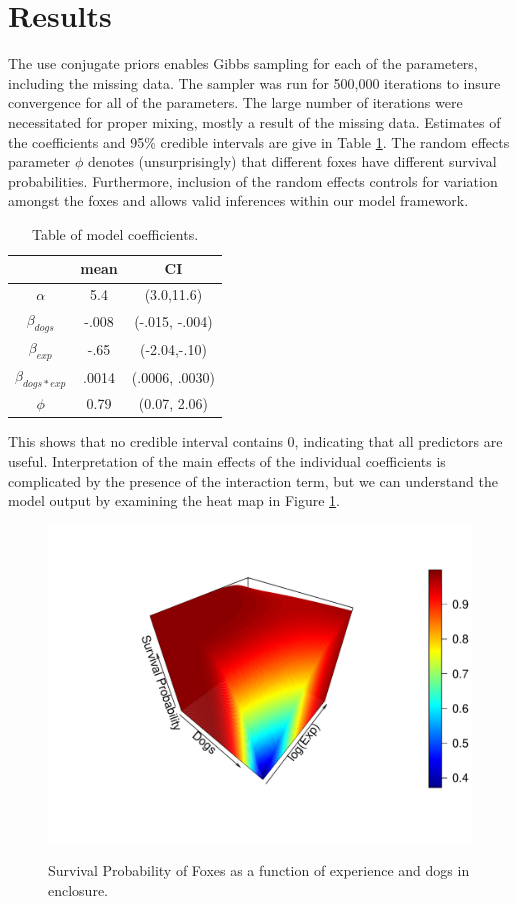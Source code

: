 \documentclass[aoas,preprint]{imsart}
\numberwithin{equation}{section}
\theoremstyle{plain}
\begin{document}
\section{Results}
The use conjugate priors enables Gibbs sampling for each of the parameters, including the missing data. The sampler was run for 500,000 iterations to insure convergence for all of the parameters. The large number of iterations were necessitated for proper mixing, mostly a result of the missing data. Estimates of the coefficients and 95\% credible intervals are give in Table \ref{tab:PostEst}. The random effects parameter $\phi$ denotes (unsurprisingly) that different foxes have different survival probabilities. Furthermore, inclusion of the random effects controls for variation amongst the foxes and allows valid inferences within our model framework.
\begin{table}[h!]
	\begin{center}
		\begin{tabular}{|c|c|c|}
			\hline
			& mean & CI \\
			\hline
			$\alpha$ & 5.4 & (3.0,11.6) \\
			$\beta_{dogs}$ & -.008 & (-.015, -.004) \\
			$\beta_{exp}$ & -.65 & (-2.04,-.10) \\
			$\beta_{dogs*exp}$ & .0014 & (.0006, .0030)\\
			$ \phi$ & 0.79 & (0.07, 2.06) \\
			\hline
		\end{tabular}
		\label{tab:PostEst}
	\end{center}
	\caption{Table of model coefficients.}
\end{table}
 This shows that no credible interval contains 0, indicating that all predictors are useful. Interpretation of the main effects of the individual coefficients is complicated by the presence of the interaction term, but we can understand the model output by examining the heat map in Figure \ref{fig:SurvProb2}. 
\begin{figure}[h!]
\begin{center}
\caption{Survival Probability of Foxes as a function of experience and dogs in enclosure.}
\includegraphics[width=1\textwidth]{survivalprob.pdf}
\label{fig:SurvProb2}
\end{center}
\end{figure}
\end{document}
